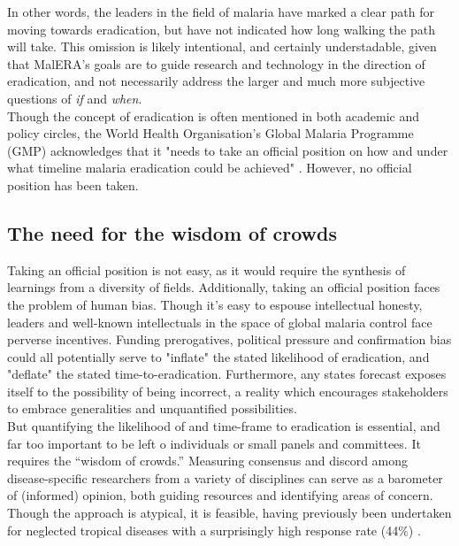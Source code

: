 \documentclass{article}
\begin{document}
\noindent In other words, the leaders in the field of malaria have marked a clear path for moving towards eradication, but have not indicated how long walking the path will take. This omission is likely intentional, and certainly understadable, given that MalERA's goals are to guide research and technology in the direction of eradication, and not necessarily address the larger and much more subjective questions of \emph{if} and \emph{when}.  \\

\noindent Though the concept of eradication is often mentioned in both academic and policy circles\cite{Mnzava2014, WHO2016}, the World Health Organisation's Global Malaria Programme (GMP) acknowledges that it "needs to take an official position on how and under what timeline malaria eradication could be achieved" \cite{WHO2015}. However, no official position has been taken.

\subsection*{The need for the wisdom of crowds}


\noindent Taking an official position is not easy, as it would require the synthesis of learnings from a diversity of fields.   Additionally, taking an official position faces the problem of human bias. Though it's easy to espouse intellectual honesty, leaders and well-known intellectuals in the space of global malaria control face perverse incentives. Funding prerogatives, political pressure and confirmation bias could all potentially serve to "inflate" the stated likelihood of eradication, and "deflate" the stated time-to-eradication. Furthermore, any states forecast exposes itself to the possibility of being incorrect, a reality which encourages stakeholders to embrace generalities and unquantified possibilities. \\


\noindent But quantifying the likelihood of and time-frame to eradication is essential, and far too important to be left o individuals or small panels and committees. It requires the “wisdom of crowds.” Measuring consensus and discord among disease-specific researchers from a variety of disciplines can serve as a barometer of (informed) opinion, both guiding resources and identifying areas of concern. Though the approach is atypical, it is feasible, having previously been undertaken for neglected tropical diseases with a surprisingly high response rate (44\%) \cite{Keenan2013}. \\
\end{document}
